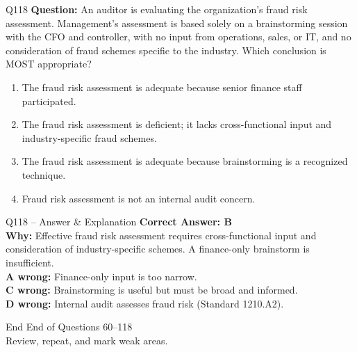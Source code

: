 \documentclass[aspectratio=169,10pt]{beamer}
\begin{document}
	\begin{frame}[t]{Q118}
		\small
		\textbf{Question:} An auditor is evaluating the organization's fraud risk assessment. Management's assessment is based solely on a brainstorming session with the CFO and controller, with no input from operations, sales, or IT, and no consideration of fraud schemes specific to the industry. Which conclusion is MOST appropriate?
		\begin{enumerate}[label=\Alph*.,itemsep=1pt,topsep=2pt]
			\item The fraud risk assessment is adequate because senior finance staff participated.
			\item The fraud risk assessment is deficient; it lacks cross-functional input and industry-specific fraud schemes.
			\item The fraud risk assessment is adequate because brainstorming is a recognized technique.
			\item Fraud risk assessment is not an internal audit concern.
		\end{enumerate}
	\end{frame}
	
	\begin{frame}[t]{Q118 -- Answer \& Explanation}
		\small
		\textbf{Correct Answer: B} \\[4pt]
		\textbf{Why:} Effective fraud risk assessment requires cross-functional input and consideration of industry-specific schemes. A finance-only brainstorm is insufficient. \\[4pt]
		\textbf{A wrong:} Finance-only input is too narrow. \\[2pt]
		\textbf{C wrong:} Brainstorming is useful but must be broad and informed. \\[2pt]
		\textbf{D wrong:} Internal audit assesses fraud risk (Standard 1210.A2).
	\end{frame}
	
	\begin{frame}{End}
		\centering
		\Large End of Questions 60--118\\[8pt]
		\normalsize Review, repeat, and mark weak areas.
	\end{frame}
	
\end{document}
